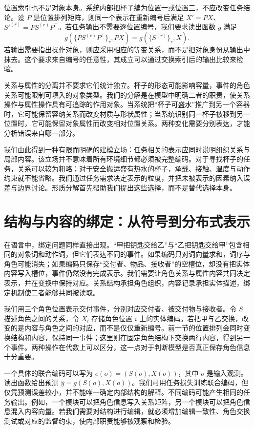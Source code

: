位置索引也不是对象本身。系统内部把杯子编为位置一或位置三，不应改变任务结论。设 $P$ 是位置排列矩阵，则同一个表示在重新编号后满足 $X'=PX$、$S'^{(r)}=PS^{(r)}P^\top$。若任务输出不需要逐位置编号，我们要求读出函数 $g$ 满足
\begin{equation}
 g\left(\{PS^{(r)}P^\top\}_r,PX\right)
 =g\left(\{S^{(r)}\}_r,X\right).
\end{equation}
若输出需要指出操作对象，则应采用相应的等变关系，而不是把对象身份从输出中抹去。这个要求来自编号的任意性，其成立可以通过交换索引后的输出比较来检验。

关系与属性的分离并不要求它们统计独立。杯子的形态可能影响容量，事件的角色关系可能限制可填入的对象类型。我们的分解是在模型中明确二者的职责，使关系操作与属性操作具有可追踪的作用对象。当系统把“杯子可盛水”推广到另一个容器时，它可能保留容纳关系而改变材质与形状属性；当系统识别同一杯子被移到另一位置时，它可能保留对象属性而改变相对位置关系。两种变化需要分别表达，才能分析错误来自哪一部分。

我们由此得到一种有限而明确的建模立场：任务相关的表示应同时说明组织关系与局部内容。该立场并不意味着所有环境细节都必须被完整编码。对于寻找杯子的任务，关系可以较为粗略；对于安全搬运盛有热水的杯子，承载、接触、温度与动作约束就不能省略。我们通过任务需求决定表示的粒度，并把未被表示的因素纳入误差与边界讨论。形质分解首先帮助我们提出这些选择，而不是替代选择本身。

\section{结构与内容的绑定：从符号到分布式表示}
\label{sec:cognition_dilemma}

在语言中，绑定问题同样直接出现。“甲把钥匙交给乙”与“乙把钥匙交给甲”包含相同的对象词和动作词，但它们表达不同的事件。如果编码只对词向量求和，词序与角色可能消失；如果编码只保存“交付者、物品、接收者”的空槽位，却没有把实体内容写入槽位，事件仍然没有完成表示。我们需要让角色关系与属性内容共同决定表示，并在变换中保持对应。关系结构承担角色组织，内容记录承担实体描述，绑定机制使二者能够共同被读取。

我们用三个角色位置表示交付事件，分别对应交付者、被交付物与接收者。令 $S$ 描述角色之间的关系，令 $X_i$ 存储角色位置 $i$ 上的实体编码。若把甲与乙交换，改变的是内容与角色之间的对应，而不是仅仅重新编号。前一节的位置排列会同时变换结构和内容，保持同一事件；这里则在固定角色结构下交换两行内容，得到另一个事件。两种操作在代数上可以区分，这一点对于判断模型是否真正保存角色信息十分重要。

一个具体的联合编码可以写为 $e(o)=(S(o),X(o))$，其中 $o$ 是输入观测。读出函数给出预测 $\widehat y=g(S(o),X(o))$。我们可用任务损失训练联合编码，但仅凭预测误差较小，并不能唯一确定内部结构的解释。不同编码可能产生相同的任务输出。例如，一个模块可以把角色信息写入关系矩阵，另一个模块可以把角色信息混入内容向量。若我们需要对结构进行编辑，就必须增加编辑一致性、角色交换测试或对应的监督约束，使内部职责能够被观察和检验。

